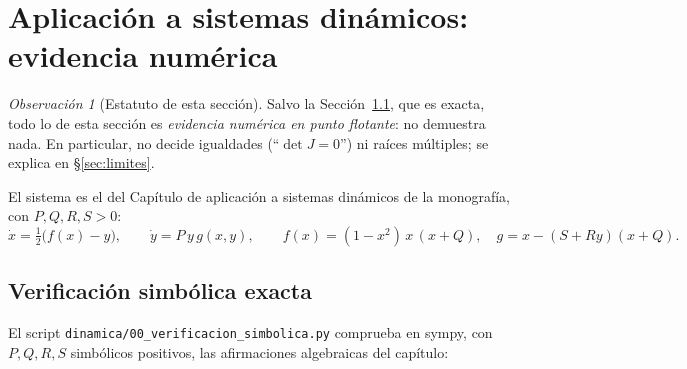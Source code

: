 \documentclass[11pt,a4paper]{article}
\theoremstyle{plain}
\theoremstyle{definition}
\theoremstyle{remark}
\newtheorem{observacion}[teorema]{Observación}
\begin{document}
\section{Aplicación a sistemas dinámicos: evidencia numérica}\label{sec:dinamica}

\begin{observacion}[Estatuto de esta sección]
Salvo la Sección~\ref{sec:dinsimb}, que es exacta, todo lo de esta sección es \emph{evidencia numérica en punto flotante}: no demuestra nada. En particular, no decide igualdades (``$\det J=0$'') ni raíces múltiples; se explica en \S\ref{sec:limites}.
\end{observacion}

El sistema es el del Capítulo de aplicación a sistemas dinámicos de la monografía, con $P,Q,R,S>0$:
\begin{equation}\label{eq:S}
\dot x=\tfrac12\big(f(x)-y\big),\qquad \dot y=P\,y\,g(x,y),\qquad f(x)=(1-x^2)\,x\,(x+Q),\quad g=x-(S+Ry)(x+Q).
\end{equation}

\subsection{Verificación simbólica exacta}\label{sec:dinsimb}

El script \texttt{dinamica/00\_verificacion\_simbolica.py} comprueba en sympy, con $P,Q,R,S$ simbólicos positivos, las afirmaciones algebraicas del capítulo:
\end{document}
